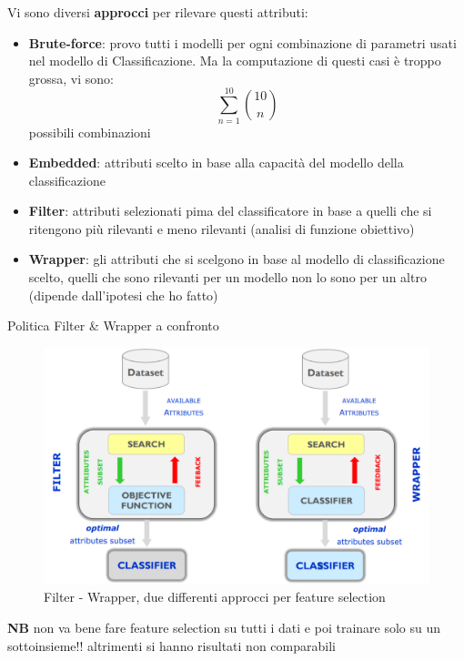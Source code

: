 Vi sono diversi \textbf{approcci} per rilevare questi attributi:
\begin{itemize}
	\item \textbf{Brute-force}: provo tutti i modelli per ogni combinazione di parametri usati nel modello di Classificazione. Ma la computazione di questi casi \`e troppo grossa, vi sono: \[\sum_{n=1}^{10}\binom{10}{n}\] possibili combinazioni
	\item \textbf{Embedded}: attributi scelto in base alla capacit\`a del modello della classificazione
	\item \textbf{Filter}: attributi selezionati pima del classificatore in base a quelli che si ritengono pi\`u rilevanti e meno rilevanti (analisi di funzione obiettivo)
	\item \textbf{Wrapper}: gli attributi che si scelgono in base al modello di classificazione scelto, quelli che sono rilevanti per un modello non lo sono per un altro (dipende dall'ipotesi che ho fatto)
\end{itemize}
Politica Filter \& Wrapper a confronto
\begin{figure}[H]
	\centering
	\includegraphics[height=0.5 \linewidth]{classification/pict/filter_wrapper.png}
	\caption{Filter - Wrapper, due differenti approcci per feature selection}
\end{figure}
\textbf{NB} non va bene fare feature selection su tutti i dati e poi trainare solo su un sottoinsieme!! altrimenti si hanno risultati non comparabili\\

